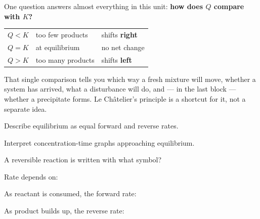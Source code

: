 \documentclass{apchem-notes}
\begin{document}
\apctitleblock

\begin{apcnote}
One question answers almost everything in this unit:
\textbf{how does $Q$ compare with $K$?}

\begin{center}
\begin{tabular}{@{}lll@{}}
\hline
$Q < K$ & too few products & shifts \textbf{right} \\
$Q = K$ & at equilibrium & no net change \\
$Q > K$ & too many products & shifts \textbf{left} \\
\hline
\end{tabular}
\end{center}

That single comparison tells you which way a fresh mixture will move,
whether a system has arrived, what a disturbance will do, and --- in the
last block --- whether a precipitate forms. Le Ch\^atelier's principle is a
shortcut for it, not a separate idea.
\end{apcnote}


\begin{objectives}
  \item Describe equilibrium as equal forward and reverse rates.
  \item Interpret concentration-time graphs approaching equilibrium.
\end{objectives}


\begin{warmup}[4]
  \item A reversible reaction is written with what symbol?
        \answerblank[2.6cm]{$\rightleftharpoons$}
  \item Rate depends on: 
  \item As reactant is consumed, the forward rate:
  \item As product builds up, the reverse rate:
\end{warmup}


\end{document}
